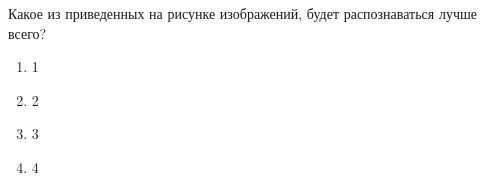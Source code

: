 
Какое из приведенных на рисунке изображений, будет распознаваться лучше всего? 


\begin{enumerate}
    \item 1
    \item 2
    \item 3
    \item 4
\end{enumerate}